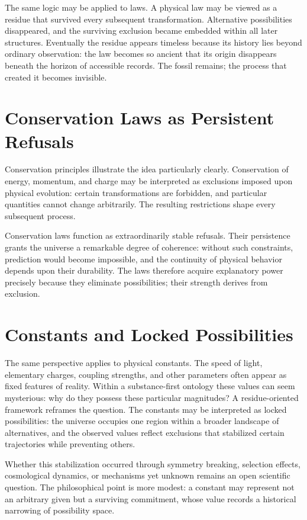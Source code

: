 \documentclass[11pt,oneside]{book}
\theoremstyle{plain}
\theoremstyle{definition}
\theoremstyle{remark}
\begin{document}
The same logic may be applied to laws. A physical law may be viewed as a residue that survived every subsequent transformation. Alternative possibilities disappeared, and the surviving exclusion became embedded within all later structures. Eventually the residue appears timeless because its history lies beyond ordinary observation: the law becomes so ancient that its origin disappears beneath the horizon of accessible records. The fossil remains; the process that created it becomes invisible.

\section{Conservation Laws as Persistent Refusals}

Conservation principles illustrate the idea particularly clearly. Conservation of energy, momentum, and charge may be interpreted as exclusions imposed upon physical evolution: certain transformations are forbidden, and particular quantities cannot change arbitrarily. The resulting restrictions shape every subsequent process.

Conservation laws function as extraordinarily stable refusals. Their persistence grants the universe a remarkable degree of coherence: without such constraints, prediction would become impossible, and the continuity of physical behavior depends upon their durability. The laws therefore acquire explanatory power precisely because they eliminate possibilities; their strength derives from exclusion.

\section{Constants and Locked Possibilities}

The same perspective applies to physical constants. The speed of light, elementary charges, coupling strengths, and other parameters often appear as fixed features of reality. Within a substance-first ontology these values can seem mysterious: why do they possess these particular magnitudes? A residue-oriented framework reframes the question. The constants may be interpreted as locked possibilities: the universe occupies one region within a broader landscape of alternatives, and the observed values reflect exclusions that stabilized certain trajectories while preventing others.

Whether this stabilization occurred through symmetry breaking, selection effects, cosmological dynamics, or mechanisms yet unknown remains an open scientific question. The philosophical point is more modest: a constant may represent not an arbitrary given but a surviving commitment, whose value records a historical narrowing of possibility space.
\end{document}
